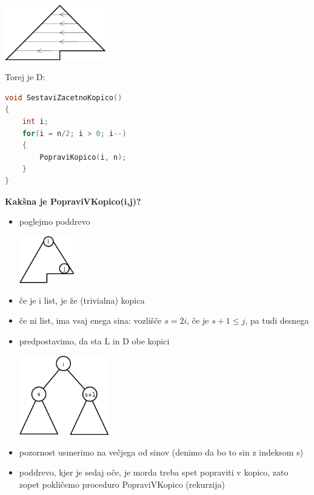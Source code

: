 \documentclass[a4paper,10pt]{article}
\begin{document}
	\begin{center}
	\includegraphics[width=4.4cm,height=2.4cm]{Slike/SestaviZacetnoKopico.png}
	\end{center}
Torej je D:
\begin{lstlisting}[language={c}]
void SestaviZacetnoKopico()
{
	int i;
	for(i = n/2; i > 0; i--)
	{
		PopraviKopico(i, n);
	}
}
\end{lstlisting}
\textbf{Kak\v sna je PopraviVKopico(i,j)?}
\begin{itemize}
\item poglejmo poddrevo
	\begin{center}
	\includegraphics[width=2.4cm,height=2.05cm]{Slike/Poddrevo.png}
	\end{center}
\item \v ce je i list, je \v ze (trivialna) kopica
\item \v ce ni list, ima vsaj enega sina: vozli\v s\v ce $s = 2i$, \v ce je $s + 1 \leq j$, pa tudi desnega 
\item predpostavimo, da sta L in D obe kopici
	\begin{center}
	\includegraphics[width=3.9cm,height=3.45cm]{Slike/KopicaLD.png}
	\end{center}
\item pozornost usmerimo na ve\v cjega od sinov (denimo da bo to sin z indeksom s)
\item poddrevo, kjer je sedaj o\v ce, je morda treba spet popraviti v kopico, zato zopet pokli\v cemo proceduro PopraviVKopico (rekurzija)
\end{itemize}
\end{document}
